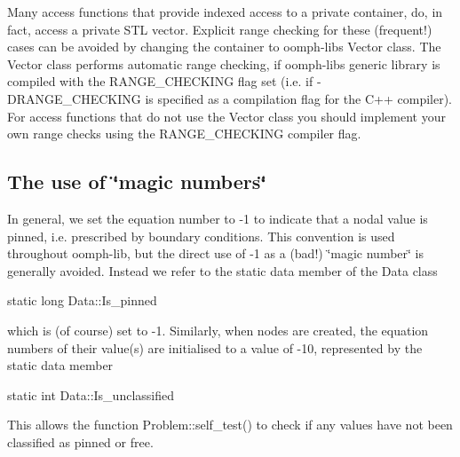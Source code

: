 Many access functions that provide indexed access to a private container, do, in fact, access a private S\+TL vector. Explicit range checking for these (frequent!) cases can be avoided by changing the container to {\ttfamily oomph-\/lib\textquotesingle{}s} {\ttfamily Vector} class. The {\ttfamily Vector} class performs automatic range checking, if {\ttfamily oomph-\/lib\textquotesingle{}s} {\ttfamily generic} library is compiled with the {\ttfamily R\+A\+N\+G\+E\+\_\+\+C\+H\+E\+C\+K\+I\+NG} flag set (i.\+e. if {\ttfamily -\/\+D\+R\+A\+N\+G\+E\+\_\+\+C\+H\+E\+C\+K\+I\+NG} is specified as a compilation flag for the C++ compiler). For access functions that do not use the {\ttfamily Vector} class you should implement your own range checks using the R\+A\+N\+G\+E\+\_\+\+C\+H\+E\+C\+K\+I\+NG compiler flag.



\hypertarget{index_magic}{}\subsection{The use of \char`\"{}magic numbers\char`\"{}}\label{index_magic}
In general, we set the equation number to -\/1 to indicate that a nodal value is pinned, i.\+e. prescribed by boundary conditions. This convention is used throughout {\ttfamily oomph-\/lib}, but the direct use of -\/1 as a (bad!) \char`\"{}magic number\char`\"{} is generally avoided. Instead we refer to the static data member of the {\ttfamily Data} class 
\begin{DoxyCode}
\textcolor{keyword}{static} \textcolor{keywordtype}{long} Data::Is\_pinned 
\end{DoxyCode}
 which is (of course) set to -\/1. Similarly, when nodes are created, the equation numbers of their value(s) are initialised to a value of -\/10, represented by the static data member 
\begin{DoxyCode}
\textcolor{keyword}{static} \textcolor{keywordtype}{int} Data::Is\_unclassified 
\end{DoxyCode}
 This allows the function {\ttfamily Problem\+::self\+\_\+test()} to check if any values have not been classified as pinned or free.



